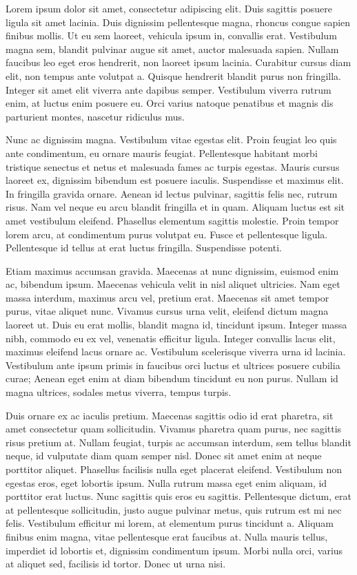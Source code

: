 \documentclass[
  letterpaper,
  DIV=11,
  numbers=noendperiod]{scrreprt}
\begin{document}
Lorem ipsum dolor sit amet, consectetur adipiscing elit. Duis sagittis
posuere ligula sit amet lacinia. Duis dignissim pellentesque magna,
rhoncus congue sapien finibus mollis. Ut eu sem laoreet, vehicula ipsum
in, convallis erat. Vestibulum magna sem, blandit pulvinar augue sit
amet, auctor malesuada sapien. Nullam faucibus leo eget eros hendrerit,
non laoreet ipsum lacinia. Curabitur cursus diam elit, non tempus ante
volutpat a. Quisque hendrerit blandit purus non fringilla. Integer sit
amet elit viverra ante dapibus semper. Vestibulum viverra rutrum enim,
at luctus enim posuere eu. Orci varius natoque penatibus et magnis dis
parturient montes, nascetur ridiculus mus.

Nunc ac dignissim magna. Vestibulum vitae egestas elit. Proin feugiat
leo quis ante condimentum, eu ornare mauris feugiat. Pellentesque
habitant morbi tristique senectus et netus et malesuada fames ac turpis
egestas. Mauris cursus laoreet ex, dignissim bibendum est posuere
iaculis. Suspendisse et maximus elit. In fringilla gravida ornare.
Aenean id lectus pulvinar, sagittis felis nec, rutrum risus. Nam vel
neque eu arcu blandit fringilla et in quam. Aliquam luctus est sit amet
vestibulum eleifend. Phasellus elementum sagittis molestie. Proin tempor
lorem arcu, at condimentum purus volutpat eu. Fusce et pellentesque
ligula. Pellentesque id tellus at erat luctus fringilla. Suspendisse
potenti.

Etiam maximus accumsan gravida. Maecenas at nunc dignissim, euismod enim
ac, bibendum ipsum. Maecenas vehicula velit in nisl aliquet ultricies.
Nam eget massa interdum, maximus arcu vel, pretium erat. Maecenas sit
amet tempor purus, vitae aliquet nunc. Vivamus cursus urna velit,
eleifend dictum magna laoreet ut. Duis eu erat mollis, blandit magna id,
tincidunt ipsum. Integer massa nibh, commodo eu ex vel, venenatis
efficitur ligula. Integer convallis lacus elit, maximus eleifend lacus
ornare ac. Vestibulum scelerisque viverra urna id lacinia. Vestibulum
ante ipsum primis in faucibus orci luctus et ultrices posuere cubilia
curae; Aenean eget enim at diam bibendum tincidunt eu non purus. Nullam
id magna ultrices, sodales metus viverra, tempus turpis.

Duis ornare ex ac iaculis pretium. Maecenas sagittis odio id erat
pharetra, sit amet consectetur quam sollicitudin. Vivamus pharetra quam
purus, nec sagittis risus pretium at. Nullam feugiat, turpis ac accumsan
interdum, sem tellus blandit neque, id vulputate diam quam semper nisl.
Donec sit amet enim at neque porttitor aliquet. Phasellus facilisis
nulla eget placerat eleifend. Vestibulum non egestas eros, eget lobortis
ipsum. Nulla rutrum massa eget enim aliquam, id porttitor erat luctus.
Nunc sagittis quis eros eu sagittis. Pellentesque dictum, erat at
pellentesque sollicitudin, justo augue pulvinar metus, quis rutrum est
mi nec felis. Vestibulum efficitur mi lorem, at elementum purus
tincidunt a. Aliquam finibus enim magna, vitae pellentesque erat
faucibus at. Nulla mauris tellus, imperdiet id lobortis et, dignissim
condimentum ipsum. Morbi nulla orci, varius at aliquet sed, facilisis id
tortor. Donec ut urna nisi.
\end{document}
